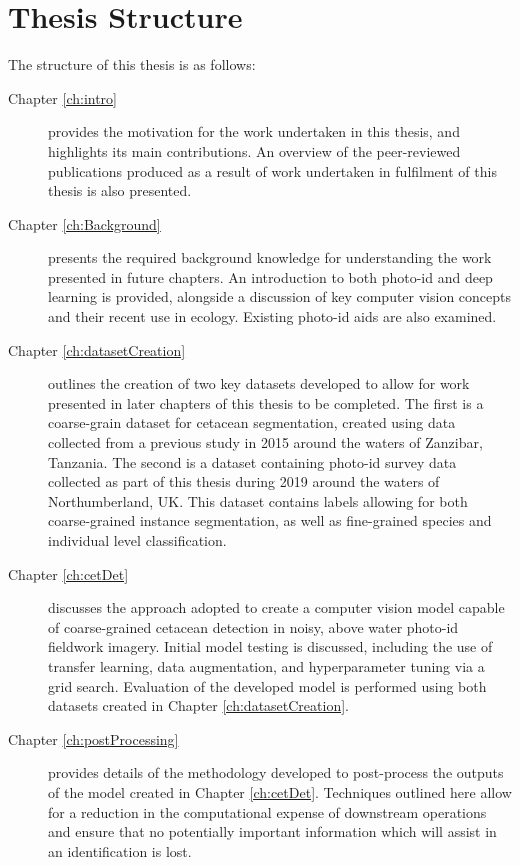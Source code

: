 \section{Thesis Structure}\label{ch:intro,sec:Structure}

The structure of this thesis is as follows:

\begin{description}
	\item[Chapter \ref{ch:intro}] provides the motivation for the work undertaken in this thesis, and highlights its main contributions. An overview of the peer-reviewed publications produced as a result of work undertaken in fulfilment of this thesis is also presented.
	
	\item[Chapter \ref{ch:Background}] presents the required background knowledge for understanding the work presented in future chapters. An introduction to both photo-id and deep learning is provided, alongside a discussion of key computer vision concepts and their recent use in ecology. Existing photo-id aids are also examined.
	
	\item[Chapter \ref{ch:datasetCreation}] outlines the creation of two key datasets developed to allow for work presented in later chapters of this thesis to be completed. The first is a coarse-grain dataset for cetacean segmentation, created using data collected from a previous study in 2015 around the waters of Zanzibar, Tanzania. The second is a dataset containing photo-id survey data collected as part of this thesis during 2019 around the waters of Northumberland, UK. This dataset contains labels allowing for both coarse-grained instance segmentation, as well as fine-grained species and individual level classification.
	
	\item[Chapter \ref{ch:cetDet}] discusses the approach adopted to create a computer vision model capable of coarse-grained cetacean detection in noisy, above water photo-id fieldwork imagery. Initial model testing is discussed, including the use of transfer learning, data augmentation, and hyperparameter tuning via a grid search. Evaluation of the developed model is performed using both datasets created in Chapter \ref{ch:datasetCreation}.
	
	\item[Chapter \ref{ch:postProcessing}] provides details of the methodology developed to post-process the outputs of the model created in Chapter \ref{ch:cetDet}.  Techniques outlined here allow for a reduction in the computational expense of downstream operations and ensure that no potentially important information which will assist in an identification is lost.
	

\end{description}
